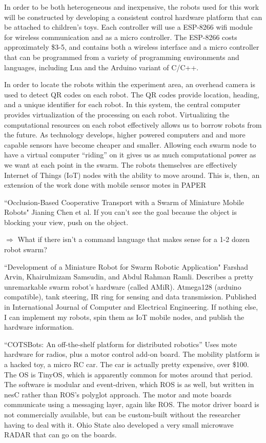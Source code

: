 \documentclass[]{article}
\begin{document}
In order to be both heterogeneous and inexpensive, the robots used for this work will be constructed by developing a consistent control hardware platform that can be attached to children's toys. 
Each controller will use a ESP-8266 wifi module for wireless communication and as a micro controller. 
The ESP-8266 costs approximately \$3-5, and contains both a wireless interface and a micro controller that can be programmed from a variety of programming environments and languages, including Lua and the Arduino variant of C/C++. 

In order to locate the robots within the experiment area, an overhead camera is used to detect QR codes on each robot. 
The QR codes provide location, heading, and a unique identifier for each robot. 
In this system, the central computer provides virtualization of the processing on each robot. 
Virtualizing the computational resources on each robot effectively allows us to borrow robots from the future. 
As technology develops, higher powered computers and and more capable sensors have become cheaper and smaller. 
Allowing each swarm node to have a virtual computer ``riding'' on it gives us as much computational power as we want at each point in the swarm.
The robots themselves are effectively Internet of Things (IoT) nodes with the ability to move around. 
This is, then, an extension of the work done with mobile sensor motes in PAPER


``Occlusion-Based Cooperative Transport with a Swarm of Miniature Mobile Robots" Jianing Chen et al. If you can't see the goal because the object is blocking your view, push on the object. 

$\Rightarrow$ What if there isn't a command language that makes sense for a 1-2 dozen robot swarm?

``Development of a Miniature Robot for Swarm Robotic Application" \cite{arvin2009development} Farshad Arvin, Khairulmizam Samsudin, and Abdul Rahman Ramli. Describes a pretty unremarkable swarm robot's hardware (called AMiR). Atmega128 (arduino compatible), tank steering, IR ring for sensing and data transmission. Published in International Journal of Computer and Electrical Engineering. If nothing else, I can implement my robots, spin them as IoT mobile nodes, and publish the hardware information. 

``COTSBots: An off-the-shelf platform for distributed robotics'' \cite{bergbreiter2003cotsbots} Uses mote hardware for radios, plus a motor control add-on board. The mobility platform is a hacked toy, a micro RC car. The car is actually pretty expensive, over \$100. The OS is TinyOS, which is apparently common for motes around that period. The software is modular and event-driven, which ROS is as well, but written in nesC rather than ROS's polyglot approach. The motor and mote boards communicate using a messaging layer, again like ROS. The motor driver board is not commercially available, but can be custom-built without the researcher having to deal with it. Ohio State also developed a very small microwave RADAR that can go on the boards.
\end{document}
